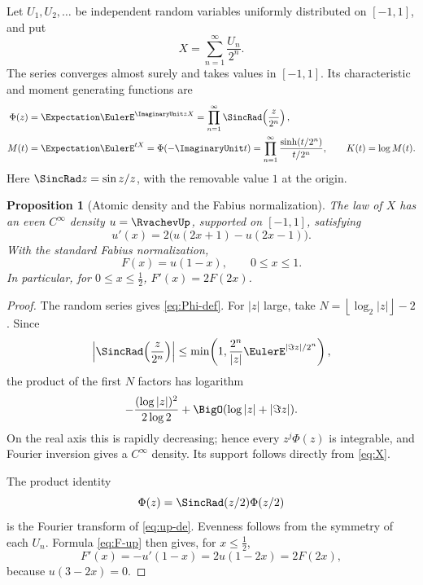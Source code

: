 \documentclass[11pt,oneside]{article}
\newtheorem{proposition}[theorem]{Proposition}
\theoremstyle{definition}
\theoremstyle{remark}
\begin{document}
Let \(U_1,U_2,\ldots\) be independent random variables uniformly distributed
on \([-1,1]\), and put
\begin{equation}
 X=\sum_{n=1}^{\infty}\frac{U_n}{2^n}.
 \label{eq:X}
\end{equation}
The series converges almost surely and takes values in \([-1,1]\).  Its
characteristic and moment generating functions are
\begin{align}
 \Phi(z)
   &=\Expectation \EulerE^{\ImaginaryUnit zX}
     =\prod_{n=1}^{\infty}
       \SincRad\!\left(\frac{z}{2^n}\right),
 \label{eq:Phi-def}\\
 M(t)
   &=\Expectation \EulerE^{tX}
     =\Phi(-\ImaginaryUnit t)
     =\prod_{n=1}^{\infty}
       \frac{\sinh(t/2^n)}{t/2^n},
 \qquad
 K(t)=\log M(t).
 \label{eq:M-def}
\end{align}
Here \(\SincRad z=\sin z/z\), with the removable value \(1\) at the origin.

\begin{proposition}[Atomic density and the Fabius normalization]
\label{prop:density}
The law of \(X\) has an even \(C^\infty\) density \(u=\RvachevUp\), supported on
\([-1,1]\), satisfying
\begin{equation}
 u'(x)=2\bigl(u(2x+1)-u(2x-1)\bigr).
 \label{eq:up-de}
\end{equation}
With the standard Fabius normalization,
\begin{equation}
 F(x)=u(1-x),\qquad 0\leq x\leq1.
 \label{eq:F-up}
\end{equation}
In particular, for \(0\leq x\leq\frac12\),
\(F'(x)=2F(2x)\).
\end{proposition}

\begin{proof}
The random series gives \eqref{eq:Phi-def}.  For \(|z|\) large, take
\(N=\left\lfloor\log_2|z|\right\rfloor-2\).  Since
\[
 \left|\SincRad\!\left(\frac z{2^n}\right)\right|
 \leq \min\!\left(1,\frac{2^n}{|z|}\EulerE^{|\Im z|/2^n}\right),
\]
the product of the first \(N\) factors has logarithm
\[
 -\frac{(\log|z|)^2}{2\log2}+\BigO(\log|z|+|\Im z|).
\]
On the real axis this is rapidly decreasing; hence every
\(z^j\Phi(z)\) is integrable, and Fourier inversion gives a \(C^\infty\)
density.  Its support follows directly from \eqref{eq:X}.

The product identity
\[
 \Phi(z)=\SincRad(z/2)\Phi(z/2)
\]
is the Fourier transform of \eqref{eq:up-de}.  Evenness follows from the
symmetry of each \(U_n\).  Formula \eqref{eq:F-up} then gives, for
\(x\leq\frac12\),
\[
 F'(x)=-u'(1-x)
      =2u(1-2x)=2F(2x),
\]
because \(u(3-2x)=0\).
\end{proof}
\end{document}
